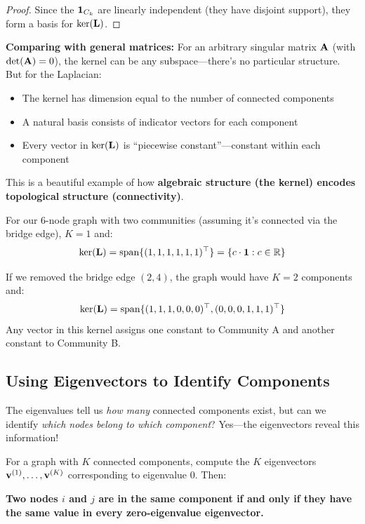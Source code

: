 \begin{notechapter}
\begin{proof}
Since the $\mathbf{1}_{C_k}$ are linearly independent (they have disjoint support), they form a basis for $\ker(\mathbf{L})$.
\end{proof}

\begin{keyidea}
\textbf{Comparing with general matrices:} For an arbitrary singular matrix $\mathbf{A}$ (with $\det(\mathbf{A}) = 0$), the kernel can be any subspace---there's no particular structure. But for the Laplacian:
\begin{itemize}
    \item The kernel has dimension equal to the number of connected components
    \item A natural basis consists of indicator vectors for each component
    \item Every vector in $\ker(\mathbf{L})$ is ``piecewise constant''---constant within each component
\end{itemize}

This is a beautiful example of how \textbf{algebraic structure (the kernel) encodes topological structure (connectivity)}.
\end{keyidea}

\begin{example}
For our 6-node graph with two communities (assuming it's connected via the bridge edge), $K = 1$ and:
\[
\ker(\mathbf{L}) = \mathrm{span}\{(1, 1, 1, 1, 1, 1)^\top\} = \{c \cdot \mathbf{1} : c \in \mathbb{R}\}
\]

If we removed the bridge edge $(2,4)$, the graph would have $K = 2$ components and:
\[
\ker(\mathbf{L}) = \mathrm{span}\{(1,1,1,0,0,0)^\top, (0,0,0,1,1,1)^\top\}
\]
Any vector in this kernel assigns one constant to Community A and another constant to Community B.
\end{example}

\subsection{Using Eigenvectors to Identify Components}

The eigenvalues tell us \textit{how many} connected components exist, but can we identify \textit{which nodes belong to which component}? Yes---the eigenvectors reveal this information!

\begin{keyidea}
For a graph with $K$ connected components, compute the $K$ eigenvectors $\mathbf{v}^{(1)}, \ldots, \mathbf{v}^{(K)}$ corresponding to eigenvalue $0$. Then:
\begin{center}
\textbf{Two nodes $i$ and $j$ are in the same component if and only if they have the same value in every zero-eigenvalue eigenvector.}
\end{center}
\end{keyidea}


\end{notechapter}

